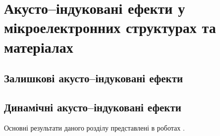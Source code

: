 \chapter{Акусто--індуковані ефекти у мікроелектронних структурах та матеріалах\label{Oglyad}}
\section{Залишкові акусто--індуковані ефекти}
\section{Динамічні акусто--індуковані ефекти}


Основні результати даного розділу представлені в роботах \cite{Olikh:SEMT2004,Olikh:SEMT2011,1UNCPS,2013Buk}.